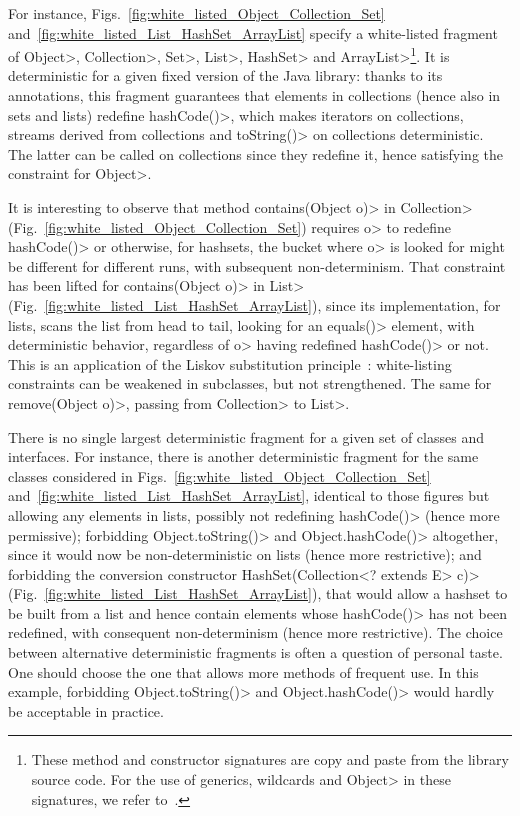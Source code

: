 For instance, Figs.~\ref{fig:white_listed_Object_Collection_Set}
and~\ref{fig:white_listed_List_HashSet_ArrayList}
specify a white-listed fragment of \<Object>,
\<Collection>, \<Set>, \<List>, \<HashSet> and
\<ArrayList>\footnote{These method and constructor signatures are copy and paste from the
library source code. For the use of generics, wildcards and
\<Object> in these signatures, we refer to~\cite{NaftalinW06}.}.
It is deterministic for a given fixed version of the Java library:
thanks to its annotations, this fragment guarantees that elements in collections
(hence also in sets and lists) redefine \<hashCode()>, which makes iterators
on collections, streams derived from collections and \<toString()> on collections
deterministic. The latter can be called on collections since they redefine it,
hence satisfying the constraint for \<Object>.

It is interesting to observe that method
\<contains(Object o)> in \<Collection> (Fig.~\ref{fig:white_listed_Object_Collection_Set})
requires \<o> to redefine \<hashCode()>
or otherwise, for hashsets, the bucket where \<o> is looked for might be different
for different runs, with subsequent non-determinism.
That constraint has been lifted for \<contains(Object o)> in \<List>
(Fig.~\ref{fig:white_listed_List_HashSet_ArrayList}), since its implementation, for lists,
scans the list from head to tail,
looking for an \<equals()> element, with deterministic behavior,
regardless of \<o> having redefined \<hashCode()> or not. This is an application
of the Liskov substitution principle~\cite{LiskovW94}:
white-listing constraints can be weakened in subclasses,
but not strengthened. The same for \<remove(Object o)>, passing from
\<Collection> to \<List>.

There is no single largest deterministic fragment
for a given set of classes and interfaces. For instance, 
there is another deterministic fragment for the same classes considered in
Figs.~\ref{fig:white_listed_Object_Collection_Set}
and~\ref{fig:white_listed_List_HashSet_ArrayList}, identical
to those figures but allowing any elements in lists, possibly not redefining
\<hashCode()> (hence more permissive);
forbidding \<Object.toString()> and \<Object.hashCode()> altogether,
since it would now be non-deterministic on lists (hence
more restrictive); and forbidding the conversion constructor
\<HashSet(Collection$\text{<}$? extends E$\text{>}$ c)>
(Fig.~\ref{fig:white_listed_List_HashSet_ArrayList}), that would allow a hashset to be
built from a list and hence contain elements whose \<hashCode()> has not been redefined,
with consequent non-determinism (hence more restrictive). The choice between alternative
deterministic fragments is often a question of personal taste.
One should choose the one that allows more methods of frequent use. In this example,
forbidding \<Object.toString()> and \<Object.hashCode()> would hardly be acceptable in practice.

